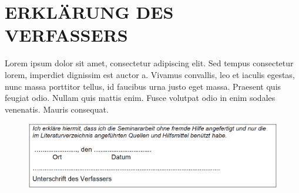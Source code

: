 \documentclass[a4paper,12pt]{article}
\begin{document}

\newpage
\section{ERKLÄRUNG DES VERFASSERS}



Lorem ipsum dolor sit amet, consectetur adipiscing elit. Sed tempus consectetur lorem, imperdiet dignissim est auctor a. Vivamus convallis, leo et iaculis egestas, nunc massa porttitor tellus, id faucibus urna justo eget massa. Praesent quis feugiat odio. Nullam quis mattis enim. Fusce volutpat odio in enim sodales venenatis. Mauris consequat.

\begin{figure}[H]
    \includegraphics[width=\linewidth]{Bilder/Sonstiges/ErklaerungDesVerfassers.png}
\end{figure}
\end{document}
